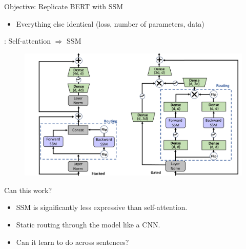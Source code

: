 \documentclass[14pt,aspectratio=169]{beamer}
\begin{document}
\begin{frame}{Objective: Replicate BERT with SSM}
\begin{itemize}
    \item Everything else identical (loss, number of parameters, data) 
\end{itemize}
\end{frame}



\begin{frame}{: Self-attention $\Rightarrow$ SSM}
\begin{figure}
    \centering
    \includegraphics[height=0.8\textheight,trim={0 0 18cm 0},clip]{Figs/model_architecture_comparison2.pdf}
    \caption{}
    \label{}
\end{figure}
\end{frame}

\begin{frame}{Can this work?}
\begin{itemize}
    \item SSM is significantly less expressive than self-attention.     
    \item Static routing through the model like a CNN.
    \item Can it learn to do  across sentences?
\end{itemize}
\pause 
\vspace{0.5cm}




\end{frame}
\end{document}
